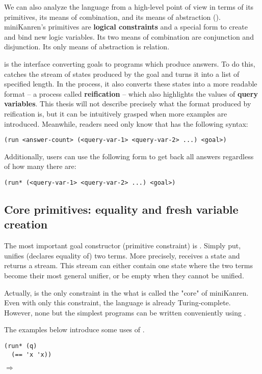 We can also analyze the language from a high-level point of view in terms of its primitives, its means of combination, and its means of abstraction (\cite[359]{sicp}). miniKanren's primitives are \textbf{logical constraints} and a special form to create and bind new logic variables. Its two means of combination are conjunction and disjunction. Its only means of abstraction is relation.

 is the interface converting goals to programs which produce answers. To do this,  catches the stream of states produced by the goal and turns it into a list of specified length. In the process, it also converts these states into a more readable format -- a process called \textbf{reification} -- which also highlights the values of \textbf{query variables}. This thesis will not describe precisely what the format produced by reification is, but it can be intuitively grasped when more examples are introduced. Meanwhile, readers need only know that  has the following syntax:
\begin{lstlisting}
(run <answer-count> (<query-var-1> <query-var-2> ...) <goal>)
\end{lstlisting}

Additionally, users can use the following form to get back all answers regardless of how many there are:
\begin{lstlisting}
(run* (<query-var-1> <query-var-2> ...) <goal>)
\end{lstlisting}

\subsection{Core primitives: equality and fresh variable creation}
The most important goal constructor (primitive constraint) is \code{==}.
Simply put, \code{==} unifies (declares equality of) two terms. More precisely, \code{==} receives a state and returns a stream. This stream can either contain one state where the two terms become their most general unifier, or be empty when they cannot be unified.

Actually, \code{==} is the only constraint in the what is called the "core" of miniKanren. Even with only this constraint, the language is already Turing-complete. However, none but the simplest programs can be written conveniently using \code{==}.

The examples below introduce some uses of \code{==}.
\begin{lstlisting}
(run* (q)
  (== 'x 'x))
\end{lstlisting}
$\Rightarrow$ 


